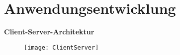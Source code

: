 \section{Anwendungsentwicklung}
\label{sec:anwendungeentwicklung}

\textbf{Client-Server-Architektur}
\begin{figure}[H]\centering\label{ClientServer}\texttt{[image: ClientServer]}\end{figure}